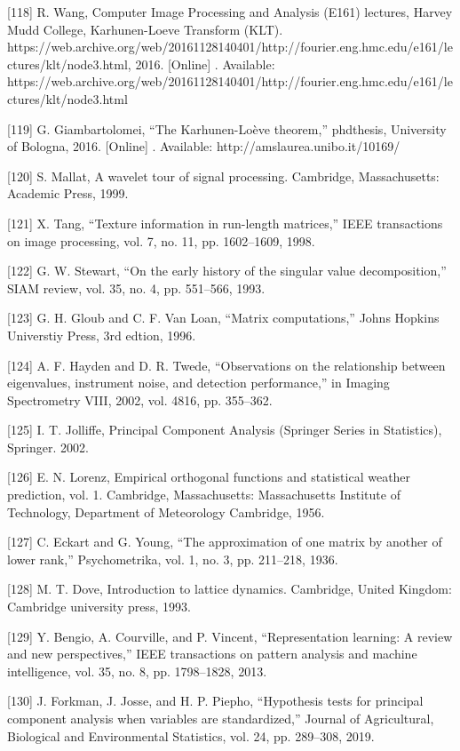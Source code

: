 \documentclass[sn-mathphys-num]{sn-jnl}%
\begin{document}
[118] R. Wang, Computer Image Processing and Analysis (E161) lectures, Harvey Mudd College, Karhunen-Loeve Transform (KLT). https://web.archive.org/web/20161128140401/http://fourier.eng.hmc.edu/e161/lectures/klt/node3.html, 2016. [Online] . Available: https://web.archive.org/web/20161128140401/http://fourier.eng.hmc.edu/e161/lectures/klt/node3.html

[119] G. Giambartolomei, “The Karhunen-Loève theorem,” phdthesis, University of Bologna, 2016. [Online] . Available: http://amslaurea.unibo.it/10169/

[120] S. Mallat, A wavelet tour of signal processing. Cambridge, Massachusetts: Academic Press, 1999.

[121] X. Tang, “Texture information in run-length matrices,” IEEE transactions on image processing, vol. 7, no. 11, pp. 1602–1609, 1998.

[122] G. W. Stewart, “On the early history of the singular value decomposition,” SIAM review, vol. 35, no. 4, pp. 551–566, 1993.

[123] G. H. Gloub and C. F. Van Loan, “Matrix computations,” Johns Hopkins Universtiy Press, 3rd edtion, 1996.

[124] A. F. Hayden and D. R. Twede, “Observations on the relationship between eigenvalues, instrument noise, and detection performance,” in Imaging Spectrometry VIII, 2002, vol. 4816, pp. 355–362.

[125] I. T. Jolliffe, Principal Component Analysis (Springer Series in Statistics), Springer. 2002.

[126] E. N. Lorenz, Empirical orthogonal functions and statistical weather prediction, vol. 1. Cambridge, Massachusetts: Massachusetts Institute of Technology, Department of Meteorology Cambridge, 1956.

[127] C. Eckart and G. Young, “The approximation of one matrix by another of lower rank,” Psychometrika, vol. 1, no. 3, pp. 211–218, 1936.

[128] M. T. Dove, Introduction to lattice dynamics. Cambridge, United Kingdom: Cambridge university press, 1993.

[129] Y. Bengio, A. Courville, and P. Vincent, “Representation learning: A review and new perspectives,” IEEE transactions on pattern analysis and machine intelligence, vol. 35, no. 8, pp. 1798–1828, 2013.

[130] J. Forkman, J. Josse, and H. P. Piepho, “Hypothesis tests for principal component analysis when variables are standardized,” Journal of Agricultural, Biological and Environmental Statistics, vol. 24, pp. 289–308, 2019.
\end{document}
